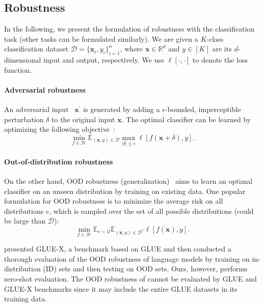 \subsection{Robustness}
\label{sec-back-robust}


In the following, we present the formulation of robustness with the classification task (other tasks can be formulated similarly).
We are given a $K$-class classification dataset $\mathcal{D}=\{\mathbf{x}_i, y_i\}_{i=1}^n$, where $\mathbf{x} \in \mathbb{R}^d$ and $y \in [K]$ are its $d$-dimensional input and output, respectively.
We use $\ell[\cdot, \cdot]$ to denote the loss function.

\paragraph{Adversarial robustness}
An adversarial input~\cite{goodfellow2014explaining} $\mathbf{x}^\prime$ is generated by adding a $\epsilon$-bounded, imperceptible perturbation $\delta$ to the original input $\mathbf{x}$.
The optimal classifier can be learned by optimizing the following objective~\cite{madry2017towards}:
\begin{equation*}
    \min_{f \in \mathcal{H}} \mathbb{E}_{(\mathbf{x}, y) \in \mathcal{D}} \max_{|\delta| \le \epsilon} \ell [f(\mathbf{x} + \delta), y].
\end{equation*}

\paragraph{Out-of-distribution robustness}
On the other hand, OOD robustness (generalization)~\cite{wang2022generalizing,shen2021towards} aims to learn an optimal classifier on an unseen distribution by training on existing data.
One popular formulation for OOD robustness is to minimize the average risk on all distributions $e$, which is sampled over the set of all possible distributions (could be large than $\mathcal{D}$):
\begin{equation*}
    \min_{f \in \mathcal{H}} \mathbb{E}_{e \sim \mathcal{Q}} \mathbb{E}_{(\mathbf{x}, y) \in \mathcal{D}^e} \ell[f(\mathbf{x}), y].
\end{equation*}

\cite{yang2022glue} presented GLUE-X, a benchmark based on GLUE and then conducted a thorough evaluation of the OOD robustness of language models by training on in-distribution (ID) sets and then testing on OOD sets.
Ours, however, performs zero-shot evaluation.
The OOD robustness of \chat cannot be evaluated by GLUE and GLUE-X benchmarks since it may include the entire GLUE datasets in its training data.
